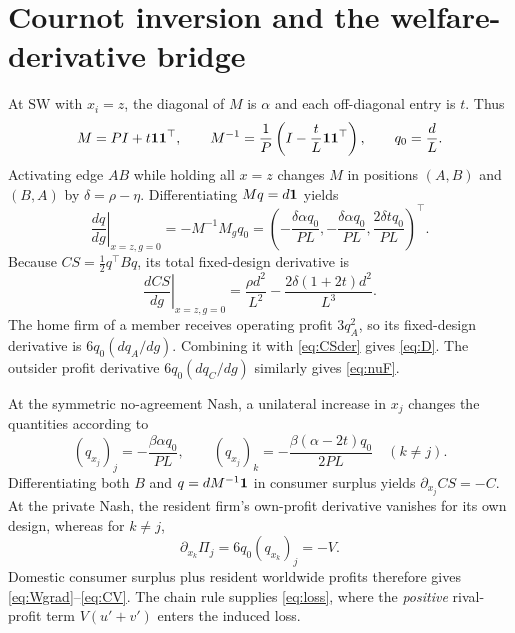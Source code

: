\documentclass[11pt,a4paper]{article}
\theoremstyle{remark}\newtheorem{remark}[theorem]{Remark}
\newcommand{\SW}{\mathrm{SW}}\newcommand{\SU}{\mathrm{SU}}\newcommand{\IS}{\mathrm{IS}}
\begin{document}
\appendix
\section{Cournot inversion and the welfare-derivative bridge}\label{app:bridge}
At $\SW$ with $x_i=z$, the diagonal of $M$ is $\alpha$ and each off-diagonal entry is $t$. Thus
\begin{equation}\label{eq:inv}
M=P I+t\boldsymbol{1}\boldsymbol{1}^{\top},\qquad
M^{-1}=\frac1P\left(I-\frac{t}{L}\boldsymbol{1}\boldsymbol{1}^{\top}\right),\qquad q_0=\frac dL.
\end{equation}
Activating edge $AB$ while holding all $x=z$ changes $M$ in positions $(A,B)$ and $(B,A)$ by $\delta=\rho-\eta$. Differentiating $Mq=d\boldsymbol{1}$ yields
\begin{equation}\label{eq:quantityDer}
\left.\frac{dq}{dg}\right|_{x=z,g=0}=-M^{-1}M_gq_0
=\left(-\frac{\delta\alpha q_0}{PL},-\frac{\delta\alpha q_0}{PL},\frac{2\delta t q_0}{PL}\right)^\top.
\end{equation}
Because $CS=\tfrac12q^\top Bq$, its total fixed-design derivative is
\begin{equation}\label{eq:CSder}
\left.\frac{dCS}{dg}\right|_{x=z,g=0}
=\frac{\rho d^2}{L^2}-\frac{2\delta(1+2t)d^2}{L^3}.
\end{equation}
The home firm of a member receives operating profit $3q_A^2$, so its fixed-design derivative is $6q_0(dq_A/dg)$. Combining it with \eqref{eq:CSder} gives \eqref{eq:D}. The outsider profit derivative $6q_0(dq_C/dg)$ similarly gives \eqref{eq:nuF}.

At the symmetric no-agreement Nash, a unilateral increase in $x_j$ changes the quantities according to
\begin{equation}\label{eq:designQuantityBridge}
(q_{x_j})_j=-\frac{\beta\alpha q_0}{PL},\qquad
(q_{x_j})_k=-\frac{\beta(\alpha-2t)q_0}{2PL}\quad(k\ne j).
\end{equation}
Differentiating both $B$ and $q=dM^{-1}\boldsymbol{1}$ in consumer surplus yields $\partial_{x_j}CS=-C$. At the private Nash, the resident firm's own-profit derivative vanishes for its own design, whereas for $k\ne j$,
\begin{equation}\label{eq:crossProfitBridge}
\partial_{x_k}\Pi_j=6q_0(q_{x_k})_j=-V.
\end{equation}
Domestic consumer surplus plus resident worldwide profits therefore gives \eqref{eq:Wgrad}--\eqref{eq:CV}. The chain rule supplies \eqref{eq:loss}, where the \emph{positive} rival-profit term $V(u'+v')$ enters the induced loss.
\end{document}
